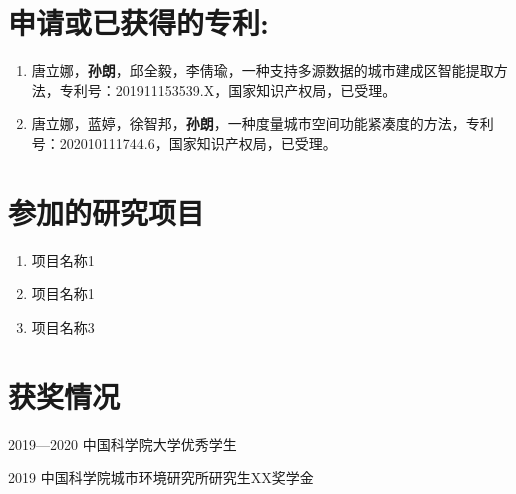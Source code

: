 \section*{申请或已获得的专利:}

{
\setlist[enumerate]{}%
\begin{enumerate}[nosep]
    \item 唐立娜，\textbf{孙朗}，邱全毅，李倩瑜，一种支持多源数据的城市建成区智能提取方法，专利号：201911153539.X，国家知识产权局，已受理。
    \item 唐立娜，蓝婷，徐智邦，\textbf{孙朗}，一种度量城市空间功能紧凑度的方法，专利号：202010111744.6，国家知识产权局，已受理。
\end{enumerate}
}

\section*{参加的研究项目}

{
\setlist[enumerate]{}%
\begin{enumerate}[nosep]
    \item 项目名称1

    \item 项目名称1

    \item 项目名称3

\end{enumerate}
}

\section*{获奖情况}
    2019—2020 \quad 中国科学院大学优秀学生

    2019 \qquad \qquad 中国科学院城市环境研究所研究生XX奖学金



\cleardoublepage[plain]%
